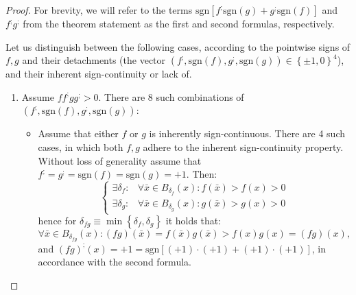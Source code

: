 \documentclass[11pt]{book}
\begin{document}
\begin{proof}For brevity, we will refer to the terms $\text{sgn}\left[f^{;}\text{sgn}\left(g\right)+g^{;}\text{sgn}\left(f\right)\right]$ and $f^{;}g^{;}$ from the theorem statement as the first and second formulas, respectively.

Let us distinguish between the following cases, according to the pointwise signs of $f,g$ and their detachments (the vector $\left(f^{;},\text{sgn}\left(f\right),g^{;},\text{sgn}\left(g\right)\right)\in\left\{ \pm1,0\right\} ^{4}$), and their inherent sign-continuity or lack of.

\begin{enumerate}

\item Assume $ff^{;}gg^{;}>0$. There are 8 such combinations of $\left(f^{;},\text{sgn}\left(f\right),g^{;},\text{sgn}\left(g\right)\right)$:

\begin{itemize}

\item
Assume that either $f$ or $g$ is inherently sign-continuous. There are 4 such cases, in which both $f,g$ adhere to the inherent sign-continuity property. Without loss of generality assume that $f^{;}=g^{;}=\text{sgn}\left(f\right)=\text{sgn}\left(g\right)=+1$. Then: $$\begin{cases} \exists\delta_{f}: & \forall\bar{x}\in B_{\delta_{f}}\left(x\right):f\left(\bar{x}\right)>f\left(x\right)>0\\ \exists\delta_{g}: & \forall\bar{x}\in B_{\delta_{g}}\left(x\right):g\left(\bar{x}\right)>g\left(x\right)>0 \end{cases}$$ hence for $\delta_{fg}\equiv\min\left\{ \delta_{f},\delta_{g}\right\}$ it holds that: $$\forall\bar{x}\in B_{\delta_{fg}}\left(x\right):\left(fg\right)\left(\bar{x}\right)=f\left(\bar{x}\right)g\left(\bar{x}\right)>f\left(x\right)g\left(x\right)=\left(fg\right)\left(x\right),$$ and  $\left(fg\right)^{;}\left(x\right)=+1=\text{sgn}\left[\left(+1\right)\cdot\left(+1\right)+\left(+1\right)\cdot\left(+1\right)\right]$, in accordance with the second formula.


\end{itemize}
\end{enumerate}
\end{proof}
\end{document}
